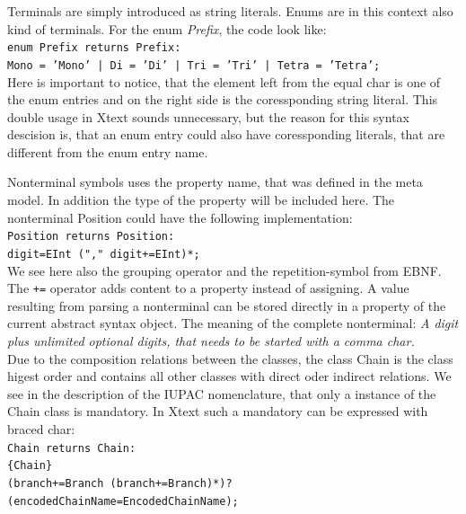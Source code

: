 \documentclass[a4paper,10pt]{article}
\newcommand{\gerquot}[1]{\glqq#1\grqq}
\newcommand{\leadingFourCharTab}{\phantom{XXXX}}
\begin{document}
Terminals are simply introduced as string literals. Enums are in this context also kind of terminals. For the enum \emph{Prefix}, the code look like:\\

\noindent\texttt{enum Prefix returns Prefix:\\
\leadingFourCharTab\leadingFourCharTab Mono = 'Mono' | Di = 'Di' | Tri = 'Tri' | Tetra = 'Tetra';}\\

Here is important to notice, that the element left from the equal char is one of the enum entries and on the right side is the coressponding string literal. This double usage in Xtext sounds unnecessary, but the reason for this syntax descision is, that an enum entry could also have coressponding literals, that are different from the enum entry name.

Nonterminal symbols uses the property name, that was defined in the meta model. In addition the type of the property will be included here. The nonterminal \gerquot{Position} could have the following implementation:\\

\noindent\texttt{Position returns Position:\\
\leadingFourCharTab\leadingFourCharTab digit=EInt ("," digit+=EInt)*;}\\

We see here also the grouping operator and the repetition-symbol from EBNF. The \texttt{+=} operator adds content to a property instead of assigning. A value resulting from parsing a nonterminal can be stored directly in a property of the current abstract syntax object. The meaning of the complete nonterminal: \emph{A digit plus unlimited optional digits, that needs to be started with a comma char.}\\

Due to the composition relations between the classes, the class \gerquot{Chain} is the class higest order and contains all other classes with direct oder indirect relations. We see in the description of the IUPAC nomenclature, that only a instance of the Chain class is mandatory. In Xtext such a mandatory can be expressed with braced char:\\

\noindent\texttt{Chain returns Chain:\\
\leadingFourCharTab\{Chain\}\\
\leadingFourCharTab\leadingFourCharTab(branch+=Branch (branch+=Branch)*)?\\
\leadingFourCharTab\leadingFourCharTab(encodedChainName=EncodedChainName);}\\
\end{document}
